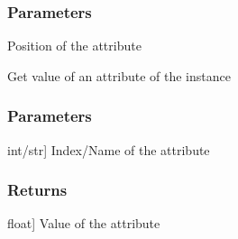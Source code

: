 \documentclass[letterpaper,10pt,english]{sphinxmanual}
\begin{document}
\begin{fulllineitems}
\begin{fulllineitems}
\subsubsection{Parameters}
\label{\detokenize{data/_autosummary/miml.data.instance.Instance:id1}}\begin{description}
\sphinxAtStartPar
Position of the attribute

\end{description}

\end{fulllineitems}


\begin{fulllineitems}
\label{\detokenize{data/_autosummary/miml.data.instance.Instance:miml.data.instance.Instance.get_attribute}}
\pysigstartsignatures
{}
\pysigstopsignatures
\sphinxAtStartPar
Get value of an attribute of the instance


\subsubsection{Parameters}
\label{\detokenize{data/_autosummary/miml.data.instance.Instance:id2}}\begin{description}
\sphinxlineitem{attribute}{[}int/str{]}
\sphinxAtStartPar
Index/Name of the attribute

\end{description}


\subsubsection{Returns}
\label{\detokenize{data/_autosummary/miml.data.instance.Instance:returns}}\begin{description}
\sphinxlineitem{value}{[}float{]}
\sphinxAtStartPar
Value of the attribute

\end{description}

\end{fulllineitems}



\end{fulllineitems}
\end{document}
